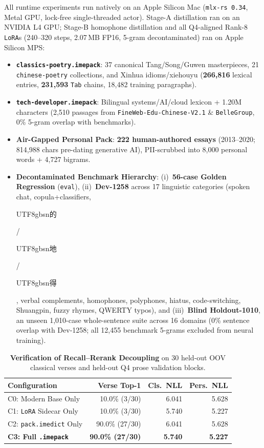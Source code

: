 \documentclass[10pt,twocolumn,letterpaper]{article}
\newcommand{\zh}[1]{\begin{CJK*}{UTF8}{gbsn}{\small #1}\end{CJK*}}
\newcommand{\zh}[1]{#1}
\begin{document}
All runtime experiments run natively on an Apple Silicon Mac (\texttt{mlx-rs 0.34}, Metal GPU, lock-free single-threaded actor). Stage-A distillation ran on an NVIDIA L4 GPU; Stage-B homophone distillation and all Q4-aligned Rank-8 \texttt{LoRA}s (240--320 steps, 2.07\,MB FP16, 5-gram decontaminated) ran on Apple Silicon MPS:
\begin{itemize}
  \item \textbf{\texttt{classics-poetry.imepack}}: 37 canonical Tang/Song/Guwen masterpieces, 21 \texttt{chinese-poetry} collections, and Xinhua idioms/xiehouyu (\textbf{266,816} lexical entries, \textbf{231,593} \texttt{Tab} chains, 18,482 training paragraphs).
  \item \textbf{\texttt{tech-developer.imepack}}: Bilingual systems/AI/cloud lexicon + 1.20M characters (2,510 passages from \texttt{FineWeb-Edu-Chinese-V2.1} \& \texttt{BelleGroup}, 0\% 5-gram overlap with benchmarks).
  \item \textbf{Air-Gapped Personal Pack}: \textbf{222 human-authored essays} (2013--2020; 814,988 chars pre-dating generative AI), PII-scrubbed into 8,000 personal words + 4,727 bigrams.
  \item \textbf{Decontaminated Benchmark Hierarchy}: (i)~\textbf{56-case Golden Regression} (\texttt{eval}), (ii)~\textbf{Dev-1258} across 17 linguistic categories (spoken chat, copula+classifiers, \zh{的}/\zh{地}/\zh{得}, verbal complements, homophones, polyphones, hiatus, code-switching, Shuangpin, fuzzy rhymes, QWERTY typos), and (iii)~\textbf{Blind Holdout-1010}, an unseen 1,010-case whole-sentence suite across 16 domains (0\% sentence overlap with Dev-1258; all 12,455 benchmark 5-grams excluded from neural training).
\end{itemize}

\begin{table}[t]
  \centering
  {\small
  \setlength{\tabcolsep}{3.5pt}
  \begin{tabular*}{\columnwidth}{@{\extracolsep{\fill}}lrrr@{}}
    \toprule
    \textbf{Configuration} & \textbf{Verse Top-1} & \textbf{Cls.\ NLL} & \textbf{Pers.\ NLL} \\
    \midrule
    C0: Modern Base Only & 10.0\% (3/30) & 6.041 & 5.628 \\
    C1: \texttt{LoRA} Sidecar Only & 10.0\% (3/30) & 5.740 & 5.227 \\
    C2: \texttt{pack.imedict} Only & 90.0\% (27/30) & 6.041 & 5.628 \\
    \textbf{C3: Full \texttt{.imepack}} & \textbf{90.0\% (27/30)} & \textbf{5.740} & \textbf{5.227} \\
    \bottomrule
  \end{tabular*}%
  }
  \vspace{-0.3em}
  \caption{\textbf{Verification of Recall--Rerank Decoupling} on 30 held-out OOV classical verses and held-out Q4 prose validation blocks.}
  \label{tab:decouple}
\end{table}
\end{document}
